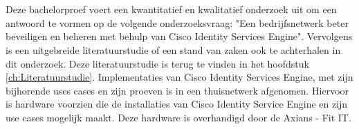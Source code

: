 
\chapter{}
\label{ch:methodologie}


Deze bachelorproef voert een kwantitatief en kwalitatief onderzoek uit om een antwoord te vormen op de volgende onderzoeksvraag: "Een bedrijfsnetwerk beter beveiligen en beheren met behulp van Cisco Identity Services Engine". 
\newline
\newline
Vervolgens is een uitgebreide literatuurstudie of een stand van zaken ook te achterhalen in dit onderzoek. Deze literatuurstudie is terug te vinden in het hoofdstuk \ref{ch:Literatuurstudie}. Implementaties van Cisco Identity Services Engine, met zijn bijhorende uses cases en zijn proeven is in een thuisnetwerk afgenomen. Hiervoor is hardware voorzien die de installaties van Cisco Identity Service Engine en zijn use cases mogelijk maakt. Deze hardware is overhandigd door de Axians - Fit IT.
\newline
\newline
